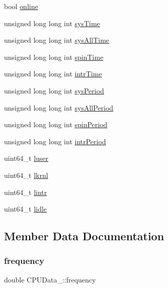 \begin{DoxyCompactItemize}
\item 
bool \hyperlink{structCPUData___aaf7e8334f4712f1242a8071f2934e8bd}{online}
\item 
unsigned long long int \hyperlink{structCPUData___a7d2af1e6d317dc65c5215a1777cdd62e}{sys\+Time}
\item 
unsigned long long int \hyperlink{structCPUData___aebf91d1521ca430154201243a14dcbdc}{sys\+All\+Time}
\item 
unsigned long long int \hyperlink{structCPUData___a49d038c72ffed8a80cdb670d45f50110}{spin\+Time}
\item 
unsigned long long int \hyperlink{structCPUData___a98de71b52d58becf22c0c57b4ba986bf}{intr\+Time}
\item 
unsigned long long int \hyperlink{structCPUData___aae111600ceef38a84f242bdf01f78b0d}{sys\+Period}
\item 
unsigned long long int \hyperlink{structCPUData___a7d0ac291b26319bfde4a61492310671e}{sys\+All\+Period}
\item 
unsigned long long int \hyperlink{structCPUData___a21e302f6cc7585d62708ddcba00d5246}{spin\+Period}
\item 
unsigned long long int \hyperlink{structCPUData___a5f71e8e93ee72ca3a0329503a024a24f}{intr\+Period}
\item 
uint64\+\_\+t \hyperlink{structCPUData___a5e9d636f2423b78e114ab18dcf7d400b}{luser}
\item 
uint64\+\_\+t \hyperlink{structCPUData___a46b0c5fc02a8aee851b91c587a1ce04a}{lkrnl}
\item 
uint64\+\_\+t \hyperlink{structCPUData___ae71647a7cfe1407a479c233194ef3362}{lintr}
\item 
uint64\+\_\+t \hyperlink{structCPUData___a9ab20e8a188212cb87324e07030faa57}{lidle}
\end{DoxyCompactItemize}


\subsection{Member Data Documentation}
\mbox{\label{structCPUData___a600b87c43bb00c4bd2a5057cd35c7b1f}} 
\subsubsection{\texorpdfstring{frequency}{frequency}}
{\footnotesize\ttfamily double C\+P\+U\+Data\+\_\+\+::frequency}

